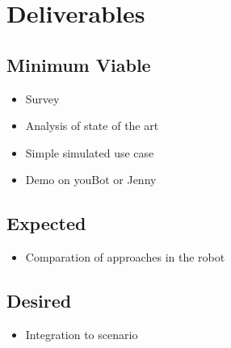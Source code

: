 \documentclass[rnd]{mas_proposal}
\begin{document}
\section{Deliverables}
\subsection{Minimum Viable}

\begin{itemize}
    \item Survey
    \item Analysis of state of the art
    \item Simple simulated use case
    \item Demo on youBot or Jenny
\end{itemize}

\subsection{Expected}
\begin{itemize}
    \item Comparation of approaches in the robot
\end{itemize}

\subsection{Desired}
\begin{itemize}
    \item Integration to scenario
\end{itemize}


\nocite{*}

\end{document}
